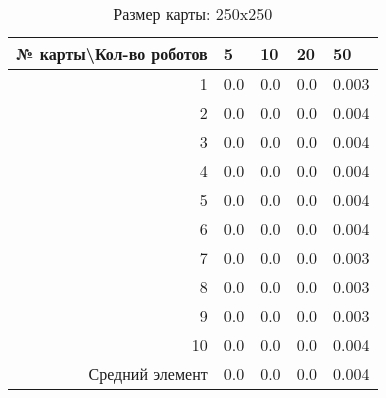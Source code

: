 \begin{table}[H]
\centering
\begin{tabular}{|r|l|l|l|l|}
\hline
№ карты\textbackslash Кол-во роботов & \textbf{5} & \textbf{10} & \textbf{20} & \textbf{50}\\ \hline
1 & 0.0 & 0.0 & 0.0 & 0.003\\ \hline
2 & 0.0 & 0.0 & 0.0 & 0.004\\ \hline
3 & 0.0 & 0.0 & 0.0 & 0.004\\ \hline
4 & 0.0 & 0.0 & 0.0 & 0.004\\ \hline
5 & 0.0 & 0.0 & 0.0 & 0.004\\ \hline
6 & 0.0 & 0.0 & 0.0 & 0.004\\ \hline
7 & 0.0 & 0.0 & 0.0 & 0.003\\ \hline
8 & 0.0 & 0.0 & 0.0 & 0.003\\ \hline
9 & 0.0 & 0.0 & 0.0 & 0.003\\ \hline
10 & 0.0 & 0.0 & 0.0 & 0.004\\ \hline
Средний элемент & 0.0 & 0.0 & 0.0 & 0.004\\ \hline
\end{tabular}
\caption*{Размер карты: 250x250}
\end{table}
